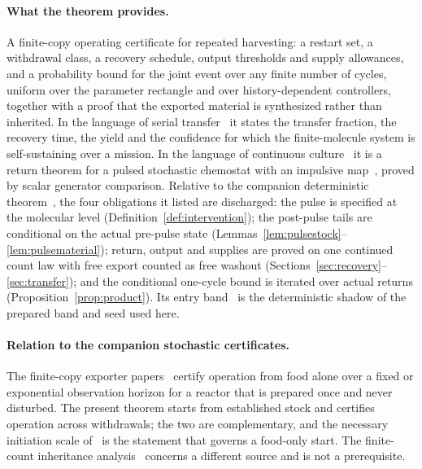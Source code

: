 \documentclass[11pt,a4paper]{article}
\theoremstyle{plain}
\theoremstyle{definition}
\theoremstyle{remark}
\begin{document}
\paragraph{What the theorem provides.}
A finite-copy operating certificate for repeated harvesting: a restart set, a withdrawal class, a recovery schedule, output thresholds and supply allowances, and a probability bound for the joint event over any finite number of cycles, uniform over the parameter rectangle and over history-dependent controllers, together with a proof that the exported material is synthesized rather than inherited. In the language of serial transfer~\citep{mills1967,lincoln2009,adamski2020} it states the transfer fraction, the recovery time, the yield and the confidence for which the finite-molecule system is self-sustaining over a mission. In the language of continuous culture~\citep{smithwaltman1995} it is a return theorem for a pulsed stochastic chemostat with an impulsive map~\citep{lakshmikantham1989}, proved by scalar generator comparison. Relative to the companion deterministic theorem~\citep[Theorem~3.1]{recovery2026}, the four obligations it listed are discharged: the pulse is specified at the molecular level (Definition~\ref{def:intervention}); the post-pulse tails are conditional on the actual pre-pulse state (Lemmas~\ref{lem:pulsestock}--\ref{lem:pulsematerial}); return, output and supplies are proved on one continued count law with free export counted as free washout (Sections~\ref{sec:recovery}--\ref{sec:transfer}); and the conditional one-cycle bound is iterated over actual returns (Proposition~\ref{prop:product}). Its entry band~\citep[Proposition~10.1]{recovery2026} is the deterministic shadow of the prepared band and seed used here.

\paragraph{Relation to the companion stochastic certificates.}
The finite-copy exporter papers~\citep{finitecopy2026,exporter2026} certify operation from food alone over a fixed or exponential observation horizon for a reactor that is prepared once and never disturbed. The present theorem starts from established stock and certifies operation across withdrawals; the two are complementary, and the necessary initiation scale of~\citep[Theorem~6.1]{thermo2026} is the statement that governs a food-only start. The finite-count inheritance analysis~\citep{inheritance2026} concerns a different source and is not a prerequisite.
\end{document}
